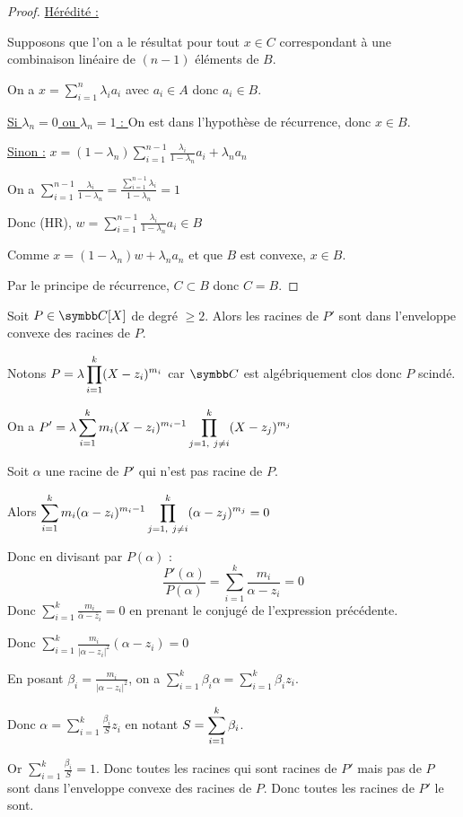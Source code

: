 \begin{proof}
    \uline{Hérédité :}

    Supposons que l'on a le résultat pour tout $x \in C$ correspondant à une combinaison
    linéaire de $(n - 1)$ éléments de $B$. 

    On a $\displaystyle x = \sum_{i = 1}^n \lambda_i a_i$ avec $a_i \in A$ donc $a_i \in B$.

    \quad \underline{Si $\lambda_n = 0$ ou $\lambda_n = 1$ : } On est dans l'hypothèse 
    de récurrence, donc $x \in B$. 

    \quad \underline{Sinon :} $\displaystyle x = (1 - \lambda_n) \sum_{i = 1}^{n - 1} \frac{\lambda_i}{1 - \lambda_n} a_i + \lambda_n a_n$

    On a $\displaystyle \sum_{i = 1}^{n - 1} \frac{\lambda_i}{1 - \lambda_n} = \frac{\sum_{i = 1}^{n - 1} \lambda_i}{1 - \lambda_n} = 1$

    Donc (HR), $\displaystyle w = \sum_{i = 1}^{n-1} \frac{\lambda_i}{1 - \lambda_n} a_i \in B$

    Comme $\displaystyle x = (1 - \lambda_n)w + \lambda_n a_n$ et que $B$ est convexe, $x \in B$. 

    Par le principe de récurrence, $C \subset B$ donc $C = B$. 
\end{proof}

\begin{exemple}
    Soit $P \in \C[X]$ de degré $\geqslant 2$. Alors les racines de $P'$ sont dans 
    l'enveloppe convexe des racines de $P$. 

    Notons $\displaystyle P = \lambda \prod_{i = 1}^k (X - z_i)^{m_i}$ car $\C$ est algébriquement clos
    donc $P$ scindé. 

    On a $\displaystyle P' = \lambda \sum_{i = 1}^k m_i (X - z_i)^{m_i - 1} \prod_{j = 1,~j\not= i}^k (X - z_j)^{m_j}$

    Soit $\alpha$ une racine de $P'$ qui n'est pas racine de $P$.

    Alors $\displaystyle \sum_{i = 1}^k m_i(\alpha - z_i)^{m_i - 1} \prod_{j = 1,~j\not= i}^k (\alpha - z_j)^{m_j} = 0$

    Donc en divisant par $P(\alpha)$ : 
    \[\frac{P'(\alpha)}{P(\alpha)}= \sum_{i = 1}^{k } \frac{m_i}{\alpha - z_i} = 0\]
    Donc $\displaystyle \sum_{i = 1}^{k} \frac{m_i}{\overline \alpha - \overline z_i} = 0$ en prenant le conjugé de l'expression précédente.
    
    Donc $\displaystyle \sum_{i = 1}^{k}\frac{m_i }{|\alpha - z_i|^2} (\alpha - z_i) = 0$
    
    En posant $\beta_i = \frac{m_i}{|\alpha - z_i|^2}$, on a
    $\displaystyle \sum_{i = 1}^{k}\beta_i \alpha = \sum_{i = 1}^{k} \beta_i z_i$.

    Donc $\displaystyle \alpha = \sum_{i = 1}^{k}\frac{\beta_i}{S} z_i$ en notant $\displaystyle S = \sum_{i=1}^k \beta_i$.

    Or $\displaystyle \sum_{i = 1}^{k}\frac{\beta_i }{S} = 1$.
    Donc toutes les racines qui sont racines de $P'$ mais pas de $P$ sont dans l'enveloppe convexe des racines de $P$.
    Donc toutes les racines de $P'$ le sont.
\end{exemple}

